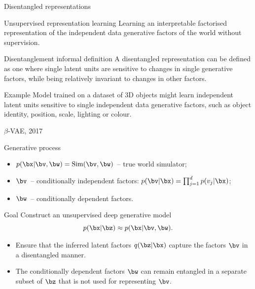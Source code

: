\begin{frame}{Disentangled representations}
	\begin{block}{Unsupervised representation learning}
	    Learning an interpretable factorised representation of the independent data generative factors of the world without supervision. 
	\end{block}
	\begin{block}{Disentanglement informal definition}
	A disentangled representation can be defined as one where single latent units are sensitive to changes in single generative factors, while being relatively invariant to changes in other factors. 
	\end{block}
	\begin{block}{Example}
	Model trained on a dataset of 3D objects might learn independent latent units sensitive to single independent data generative factors, such as object identity, position, scale, lighting or colour. 
	\end{block}
\end{frame}
\begin{frame}{$\beta$-VAE, 2017}
	\begin{block}{Generative process}
	\begin{itemize}
	    \item $p(\bx | \bv, \bw) = \text{Sim}(\bv, \bw)$~-- true world simulator;
	    \item $\bv$~-- conditionally independent factors: $p(\bv | \bx) = \prod_{j=1}^d p(v_j | \bx)$;
	    \item $\bw$~-- conditionally dependent factors. 
	\end{itemize}
	\end{block}
	\begin{block}{Goal}
	Construct an unsupervised deep generative model
	\[
	    p(\bx | \bz) \approx p(\bx | \bv, \bw).
	\]
	\vspace{-0.5cm}
	\begin{itemize}
	    \item Ensure that the inferred latent factors $q(\bz|\bx)$ capture the factors $\bv$ in a disentangled manner. 
	    \item The conditionally dependent factors $\bw$ can remain entangled in a separate subset of $\bz$ that is not used for representing $\bv$. 
	\end{itemize}
	\end{block}
\end{frame}
